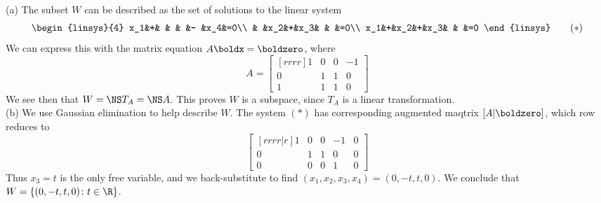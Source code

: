 \begin{solution}
\noindent
(a) The subset $W$ can be described as the set of solutions to the linear system
\[
\begin{linsys}{4}
x_1&+& & & &- &x_4&=0\\
& &x_2&+&x_3& & &=0\\
x_1&+&x_2&+&x_3& & &=0
\end{linsys}\tag{$*$}
\]
We can express this with the matrix equation $A\boldx=\boldzero$, where 
\[
A=\begin{bmatrix}[rrrr]
1&0&0&-1\\
0&1&1&0\\
1&1&1&0
\end{bmatrix}
\]
We see then that $W=\NS T_A=\NS A$. This proves $W$ is a subspace, since $T_A$ is a linear transformation. 
\\
(b) We use Gaussian elimination to help describe $W$. The system $(*)$ has corresponding augmented maqtrix $[A\vert \boldzero]$, which row reduces to 
\[
\begin{bmatrix}[rrrr|r]
\boxed{1}&0&0&-1&0\\
0&\boxed{1}&1&0&0\\
0&0&0&\boxed{1}&0
\end{bmatrix}
\]  
Thus $x_3=t$ is the only free variable, and we back-substitute to find $(x_1,x_2,x_3,x_4)=(0,-t,t,0)$. We conclude that 
$W=\{(0,-t,t,0)\colon t\in\R\}$. 
\end{solution}



